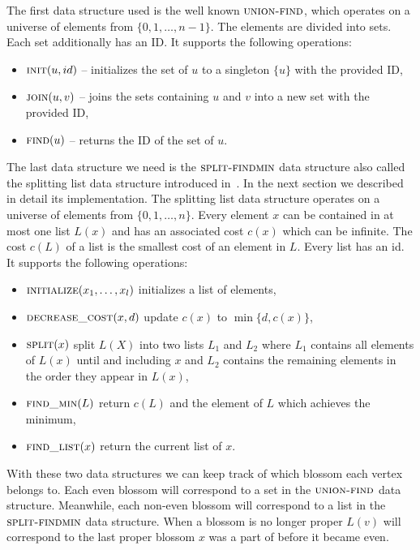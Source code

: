 The first data structure used is the well known $\textsc{union-find}$, which operates on a universe of elements from $\{ 0, 1, \dots, n-1 \}$. The elements are divided into sets. Each set additionally has an ID\@. It supports the following operations:

\begin{itemize}
    \item $\textsc{init}(u, id)$ – initializes the set of $u$ to a singleton $\{u\}$ with the provided ID,
    \item $\textsc{join}(u, v)$ – joins the sets containing $u$ and $v$ into a new set with the provided ID,
    \item $\textsc{find}(u)$ – returns the ID of the set of $u$.
\end{itemize}

The last data structure we need is the $\textsc{split-findmin}$ data structure also called the splitting list data structure introduced in~\cite{gabow1985scaling}. In the next section we described in detail its implementation. The splitting list data structure operates on a universe of elements from $\{0, 1, \dots, n\}$. Every element $x$ can be contained in at most one list $L(x)$ and has an associated cost $c(x)$ which can be infinite. The cost $c(L)$ of a list is the smallest cost of an element in $L$. Every list has an id. It supports the following operations:

\begin{itemize}
    \item $\textsc{initialize}(x_1, \dots, x_l)$ initializes a list of elements,
    \item $\textsc{decrease\_cost}(x, d)$ update $c(x)$ to $\min\{d, c(x)\}$,
    \item $\textsc{split}(x)$ split $L(X)$ into two lists $L_1$ and $L_2$ where $L_1$ contains all elements of $L(x)$ until and including $x$ and $L_2$ contains the remaining elements in the order they appear in $L(x)$,
    \item $\textsc{find\_min}(L)$ return $c(L)$ and the element of $L$ which achieves the minimum,
    \item $\textsc{find\_list}(x)$ return the current list of $x$.
\end{itemize}

With these two data structures we can keep track of which blossom each vertex belongs to. Each even blossom will correspond to a set in the $\textsc{union-find}$ data structure. Meanwhile, each non-even blossom will correspond to a list in the $\textsc{split-findmin}$ data structure. When a blossom is no longer proper $L(v)$ will correspond to the last proper blossom $x$ was a part of before it became even.

